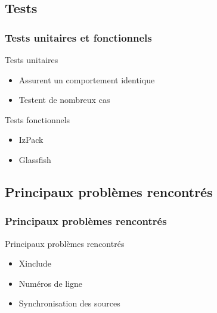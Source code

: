 \subsection{Tests}
\begin{frame}\frametitle{Tests unitaires et fonctionnels}
\begin{minipage}[c]{.9\linewidth}
\begin{beamerboxesrounded}[shadow=true]{Tests unitaires}
\begin{itemize}
	\item Assurent un comportement identique
	\item Testent de nombreux cas
\end{itemize}
\end{beamerboxesrounded}
\end{minipage}
\vfill
\begin{minipage}[c]{.9\linewidth}
\begin{beamerboxesrounded}[shadow=true]{Tests fonctionnels}
\begin{itemize}
	\item IzPack
	\item Glassfish
\end{itemize}
\end{beamerboxesrounded}
\end{minipage}
\end{frame}

\subsection{Principaux problèmes rencontrés}
\begin{frame}\frametitle{Principaux problèmes rencontrés}
\begin{beamerboxesrounded}[shadow=true]{Principaux problèmes rencontrés}
\begin{itemize}
	\item Xinclude
	\item Numéros de ligne
	\item Synchronisation des sources
\end{itemize}
\end{beamerboxesrounded}
\end{frame}
